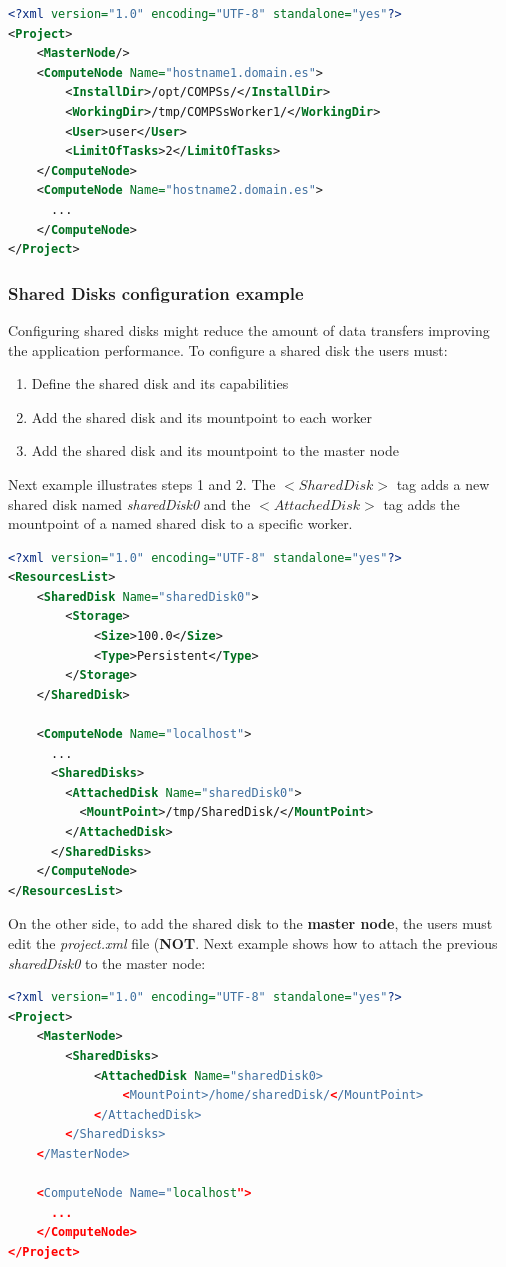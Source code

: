 \begin{lstlisting}[language=xml]
<?xml version="1.0" encoding="UTF-8" standalone="yes"?>                                                                                                                                                            
<Project>
    <MasterNode/>
    <ComputeNode Name="hostname1.domain.es">
        <InstallDir>/opt/COMPSs/</InstallDir>
        <WorkingDir>/tmp/COMPSsWorker1/</WorkingDir>
        <User>user</User>
        <LimitOfTasks>2</LimitOfTasks>
    </ComputeNode>
    <ComputeNode Name="hostname2.domain.es">
      ...
    </ComputeNode>
</Project>
\end{lstlisting}


\subsubsection{Shared Disks configuration example}
Configuring shared disks might reduce the amount of data transfers improving the application performance. To configure a 
shared disk the users must:
\begin{enumerate}
 \item Define the shared disk and its capabilities
 \item Add the shared disk and its mountpoint to each worker
 \item Add the shared disk and its mountpoint to the master node
\end{enumerate}

Next example illustrates steps 1 and 2. The $<SharedDisk>$ tag adds a new shared disk named \textit{sharedDisk0} and the
$<AttachedDisk>$ tag adds the mountpoint of a named shared disk to a specific worker.
\begin{lstlisting}[language=xml]
<?xml version="1.0" encoding="UTF-8" standalone="yes"?>
<ResourcesList>
    <SharedDisk Name="sharedDisk0">
        <Storage>
            <Size>100.0</Size>
            <Type>Persistent</Type>
        </Storage>
    </SharedDisk>
    
    <ComputeNode Name="localhost">
      ...
      <SharedDisks>
        <AttachedDisk Name="sharedDisk0">
          <MountPoint>/tmp/SharedDisk/</MountPoint>
        </AttachedDisk>
      </SharedDisks>
    </ComputeNode>
</ResourcesList>
\end{lstlisting} 

On the other side, to add the shared disk to the \textbf{master node}, the users must edit the \textit{project.xml} file
(\textbf{NOT}. Next example shows how to attach the previous \textit{sharedDisk0} to the master node:
\begin{lstlisting}[language=xml]
<?xml version="1.0" encoding="UTF-8" standalone="yes"?>
<Project>
    <MasterNode>
        <SharedDisks>
            <AttachedDisk Name="sharedDisk0>
                <MountPoint>/home/sharedDisk/</MountPoint>
            </AttachedDisk>
        </SharedDisks>
    </MasterNode>
    
    <ComputeNode Name="localhost">
      ...
    </ComputeNode>
</Project>
\end{lstlisting}

